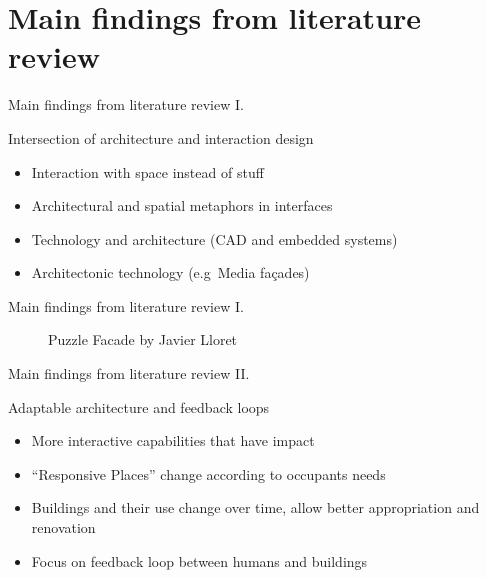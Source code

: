 \documentclass[10pt]{beamer}
\begin{document}
\section{Main findings from literature review}


\begin{frame}{Main findings from literature review I.}
	\begin{block}{Intersection of architecture and interaction design}
	\begin{itemize}
        \pause{}
		\item Interaction with space instead of stuff
        \pause{}
		\item Architectural and spatial metaphors in interfaces
        \pause{}
        \item Technology and architecture (CAD and embedded systems)
        \pause{}
        \item Architectonic technology (e.g\ Media fa\c{c}ades)
	\end{itemize}	
	\end{block}
\end{frame}

\begin{frame}{Main findings from literature review I.}
    \begin{figure}
    \centering
    \caption{Puzzle Facade by Javier Lloret}
    \end{figure}
\end{frame}


\begin{frame}{Main findings from literature review II.}
	\begin{block}{Adaptable architecture and feedback loops}
	\begin{itemize}
        \pause{}
		\item More interactive capabilities that have impact
        \pause{}
		\item ``Responsive Places'' change according to occupants needs
        \pause{}
        \item Buildings and their use change over time, allow better appropriation and renovation
        \pause{}
		\item Focus on feedback loop between humans and buildings
	\end{itemize}	
	\end{block}

\end{frame}
\end{document}
